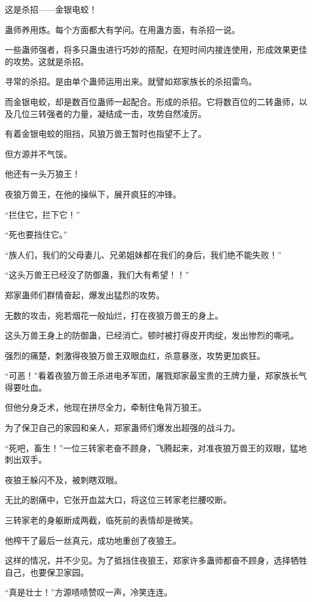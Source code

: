 \begin{this_body}
这是杀招——金银电蛟！

蛊师养用炼。每个方面都大有学问。在用蛊方面，有杀招一说。

一些蛊师强者，将多只蛊虫进行巧妙的搭配，在短时间内接连使用，形成效果更佳的攻势。这就是杀招。

寻常的杀招。是由单个蛊师运用出来。就譬如郑家族长的杀招雷鸟。

而金银电蛟，却是数百位蛊师一起配合。形成的杀招。它将数百位的二转蛊师，以及几位三转强者的力量，凝结成一击，攻势自然凌厉。

有着金银电蛟的阻挡，风狼万兽王暂时也指望不上了。

但方源并不气馁。

他还有一头万狼王！

夜狼万兽王，在他的操纵下，展开疯狂的冲锋。

“拦住它，拦下它！”

“死也要挡住它。”

“族人们，我们的父母妻儿、兄弟姐妹都在我们的身后，我们绝不能失败！”

“这头万兽王已经没了防御蛊，我们大有希望！！”

郑家蛊师们群情奋起，爆发出猛烈的攻势。

无数的攻击，宛若烟花一般灿烂，打在夜狼万兽王的身上。

这头万兽王身上的防御蛊，已经消亡。顿时被打得皮开肉绽，发出惨烈的嘶吼。

强烈的痛楚，刺激得夜狼万兽王双眼血红，杀意暴涨，攻势更加疯狂。

“可恶！”看着夜狼万兽王杀进电矛军团，屠戮郑家最宝贵的王牌力量，郑家族长气得要吐血。

但他分身乏术，他现在拼尽全力，牵制住龟背万狼王。

为了保卫自己的家园和亲人，郑家蛊师们爆发出超强的战斗力。

“死吧，畜生！”一位三转家老奋不顾身，飞腾起来，对准夜狼万兽王的双眼，猛地刺出双手。

夜狼王躲闪不及，被刺瞎双眼。

无比的剧痛中，它张开血盆大口，将这位三转家老拦腰咬断。

三转家老的身躯断成两截，临死前的表情却是微笑。

他榨干了最后一丝真元，成功地重创了夜狼王。

这样的情况，并不少见。为了抵挡住夜狼王，郑家许多蛊师都奋不顾身，选择牺牲自己，也要保卫家园。

“真是壮士！”方源啧啧赞叹一声，冷笑连连。


\end{this_body}
